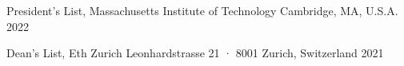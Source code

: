 
\begin{cvhonors}
  
  \cvhonor
    {President's List,} %
    {Massachusetts Institute of Technology} %
    {Cambridge, MA, U.S.A.} %
    {2022} %

  \cvhonor
    {Dean's List,} %
    {Eth Zurich} %
    {Leonhardstrasse 21 · 8001 Zurich, Switzerland} %
    {2021} %

\end{cvhonors}